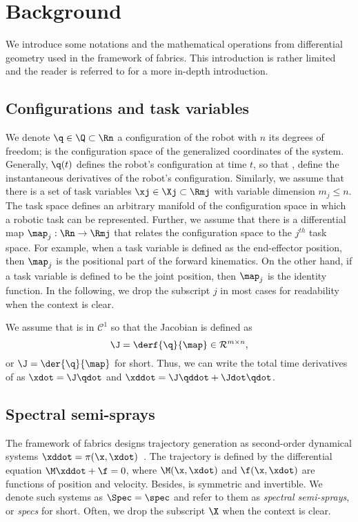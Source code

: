 \section{Background}
\label{sec:math}
%
We introduce some notations and the mathematical operations 
from differential geometry used in the framework of
\ac{fabrics}. This introduction is rather limited and the
reader is referred to \cite{Ratliff2021,Spahn2023,Wyk2022} for a more in-depth
introduction.
%
\subsection{Configurations and task variables}%
\label{sub:configurations_and_task_variables}
%
We denote $\q\in\Q\subset\Rn$ a configuration of the robot with $n$ its degrees
of freedom; \Q{} is the configuration space of the generalized coordinates of
the system. Generally, $\q(t)$ defines the robot's configuration at time $t$, so
that \qdot, \qddot{} define the instantaneous derivatives of the robot's
configuration. Similarly, we assume that there is a set of task variables
$\xj\in\Xj\subset\Rmj$ with variable dimension $m_j \leq n$. The task space
\Xj{} defines an arbitrary manifold of the configuration space \Q{} in which a
robotic task can be represented. Further, we assume that there is a differential
map $\map_j:\Rn\rightarrow\Rmj$ that relates the configuration space to the
$j^{th}$ task space. For example, when a task variable is defined as the
end-effector position, then $\map_j$ is the positional part of the forward
kinematics. On the other hand, if a task variable is defined to be the joint
position, then $\map_j$ is the identity function. In the following, we drop the
subscript $j$ in most cases for readability when the context is clear.

We assume that \map{} is in $\mathcal{C}^1$ so that the Jacobian is
defined as
\begin{equation}
  \J = \derf{\q}{\map} \in \mathcal{R}^{m\times n}, 
\end{equation}
or $\J = \der{\q}{\map}$ for short.
Thus, we can write the total time derivatives of \x{} as
$\xdot = \J\qdot$ and $\xddot = \J\qddot + \Jdot\qdot$.
%
\subsection{Spectral semi-sprays}%
\label{sub:semi_spectral_sprays}
%
The framework of
\ac{fabrics} designs trajectory generation as second-order dynamical systems $\xddot =
\pi(\x,\xdot)$~\cite{Cheng2020,Ratliff2020}. The trajectory is defined by the
differential equation $\M\xddot + \f = 0$, where $\M(\x,\xdot)$ and
$\f(\x,\xdot)$ are functions of position and velocity. Besides, \M{} is
symmetric and invertible. We denote such systems as $\Spec = \spec$ and refer to
them as \textit{spectral semi-sprays}, or \textit{specs} for
short. Often, we drop the subscript $\X$ when the context is clear.
%
